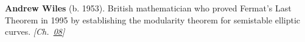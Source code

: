 \textbf{Andrew Wiles} (b. 1953). British mathematician who proved Fermat's Last Theorem in 1995 by establishing the modularity theorem for semistable elliptic curves. \emph{[Ch.~\hyperref[ch:boundedprimegaps]{08}]}

